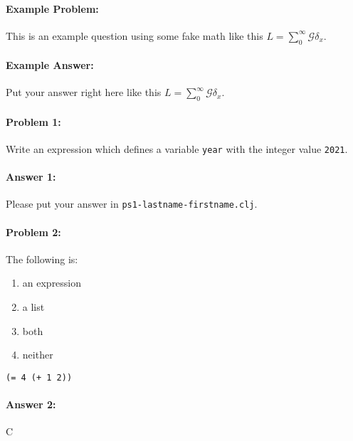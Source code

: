 \documentclass[10pt]{article}
\newcommand{\PSnum}{1}
\begin{document}
\noindent\hrulefill%

\paragraph{Example Problem:}
This is an example question using some fake math like this
$L=\sum_0^{\infty} \mathcal{G} \delta_x$.

\paragraph{Example Answer:} Put your answer right here like
this $L=\sum_0^{\infty} \mathcal{G} \delta_x$.

\noindent\hrulefill%

\pagebreak%

\noindent\hrulefill%

\paragraph{Problem 1:}
Write an expression which defines a variable \texttt{year} with the integer
value \texttt{2021}.

\paragraph{Answer 1:} Please put your answer in \texttt{ps\PSnum-lastname-firstname.clj}.

\noindent\hrulefill%

\paragraph{Problem 2:}
The following is:
\begin{enumerate}[nosep, label=\Alph*.]
  \item an expression
  \item a list
  \item both
  \item neither
\end{enumerate}

\begin{lstlisting}
(= 4 (+ 1 2))
\end{lstlisting}

\paragraph{Answer 2:} C
\hfill
\end{document}
